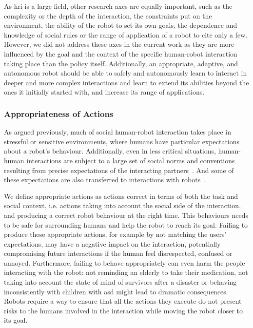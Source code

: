     As \gls{hri} is a large field, other research axes are equally important, such as the complexity or the depth of the interaction, the constraints put on the environment, the ability of the robot to set its own goals, the dependence and knowledge of social rules or the range of application of a robot to cite only a few. However, we did not address these axes in the current work as they are more influenced by the goal and the context of the specific human-robot interaction taking place than the policy itself. Additionally, an appropriate, adaptive, and autonomous robot should be able to safely and autonomously learn to interact in deeper and more complex interactions and learn to extend its abilities beyond the ones it initially started with, and increase its range of applications.

\subsubsection{Appropriateness of Actions} \label{ssec:appropriateness} %
    As argued previously, much of social human-robot interaction takes place in  stressful or sensitive environments, where humans have particular expectations about a robot's behaviour. Additionally, even in less critical situations, human-human interactions are subject to a large set of social norms and conventions resulting from precise expectations of the interacting partners~\citep{sherif1936psychology}. And some of these expectations are also transferred to interactions with robots~\citep{bartneck2004design}.
    
    We define appropriate actions as actions correct in terms of both the task and social context, i.e. actions taking into account the social side of the interaction, and producing a correct robot behaviour at the right time. This behaviours needs to be safe for surrounding humans and help the robot to reach its goal. Failing to produce these appropriate actions, for example by not matching the users' expectations, may have a negative impact on the interaction, potentially compromising future interactions if the human feel disrespected, confused or annoyed. Furthermore, failing to behave appropriately can even harm the people interacting with the robot: not reminding an elderly to take their medication, not taking into account the state of mind of survivors after a disaster or behaving inconsistently with children with \gls{asd} might lead to dramatic consequences. Robots require a way to ensure that all the actions they execute do not present risks to the humans involved in the interaction while moving the robot closer to its goal.
	
